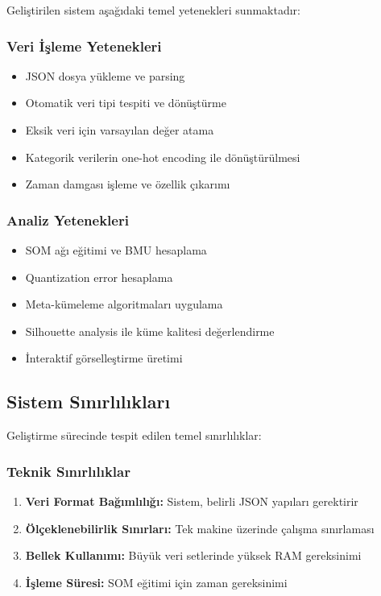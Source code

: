 Geliştirilen sistem aşağıdaki temel yetenekleri sunmaktadır:

\subsubsection{Veri İşleme Yetenekleri}

\begin{itemize}
    \item JSON dosya yükleme ve parsing
    \item Otomatik veri tipi tespiti ve dönüştürme
    \item Eksik veri için varsayılan değer atama
    \item Kategorik verilerin one-hot encoding ile dönüştürülmesi
    \item Zaman damgası işleme ve özellik çıkarımı
\end{itemize}

\subsubsection{Analiz Yetenekleri}

\begin{itemize}
    \item SOM ağı eğitimi ve BMU hesaplama
    \item Quantization error hesaplama
    \item Meta-kümeleme algoritmaları uygulama
    \item Silhouette analysis ile küme kalitesi değerlendirme
    \item İnteraktif görselleştirme üretimi
\end{itemize}

\newpage

\subsection{Sistem Sınırlılıkları}

Geliştirme sürecinde tespit edilen temel sınırlılıklar:

\subsubsection{Teknik Sınırlılıklar}

\begin{enumerate}
    \item \textbf{Veri Format Bağımlılığı:} Sistem, belirli JSON yapıları gerektirir
    
    \item \textbf{Ölçeklenebilirlik Sınırları:} Tek makine üzerinde çalışma sınırlaması
    
    \item \textbf{Bellek Kullanımı:} Büyük veri setlerinde yüksek RAM gereksinimi
    
    \item \textbf{İşleme Süresi:} SOM eğitimi için zaman gereksinimi
\end{enumerate}

